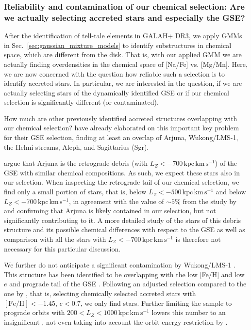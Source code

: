 \documentclass[fleqn,usenatbib]{mnras}
\newcommand{\kpckms}{\,\mathrm{kpc\,km\,s^{-1}}}	%
\begin{document}
\subsubsection{Reliability and contamination of our chemical selection: Are we actually selecting accreted stars and especially the GSE?} \label{sec:reliability_selection}

After the identification of tell-tale elements in GALAH+ DR3, we apply GMMs in Sec.~\ref{sec:gaussian_mixture_models} to identify substructures in chemical space, which are different from the disk. That is, with our applied GMM we are actually finding overdensities in the chemical space of [Na/Fe] vs. [Mg/Mn]. Here, we are now concerned with the question how reliable such a selection is to identify accreted stars. In particular, we are interested in the question, if we are actually selecting stars of the dynamically identified GSE or if our chemical selection is significantly different (or contaminated).

How much are other previously identified accreted structures overlapping with our chemical selection? \citet{Naidu2020} have already elaborated on this important key problem for their GSE selection, finding at least an overlap of Arjuna, Wukong/LMS-1, the Helmi streams, Aleph, and Sagittarius (Sgr).

\citet{Naidu2021} argue that Arjuna is the retrograde debris (with $L_Z < -700 \kpckms$) of the GSE with similar chemical compositions. As such, we expect these stars also in our selection. When inspecting the retrograde tail of our chemical selection, we find only a small portion of stars, that is,  below $L_Z < -500 \kpckms$ and  below $L_Z < -700 \kpckms$, in agreement with the value of $\sim 5\%$ from the study by \citet{Naidu2021} and confirming that Arjuna is likely contained in our selection, but not significantly contributing to it. A more detailed study of the  stars of this debris structure and its possible chemical differences with respect to the GSE as well as comparison with all the  stars with $L_Z < -700 \kpckms$ is therefore not necessary for this particular discussion.

We further do not anticipate a significant contamination by Wukong/LMS-1 \citep{Yuan2020a, Naidu2020}. This structure has been identified to be overlapping with the low [Fe/H] and low $e$ and prograde tail of the GSE \citep{Naidu2020}. Following an adjusted selection compared to the one by \citet{Naidu2020}, that is, selecting chemically selected accreted stars with $\mathrm{[Fe/H]} < -1.45$, $e < 0.7$, we only find  stars. Further limiting the sample to prograde orbits with $200 < L_Z < 1000\kpckms$ lowers this number to an insignificant , not even taking into account the orbit energy restriction by \citet{Naidu2020}.
\end{document}
